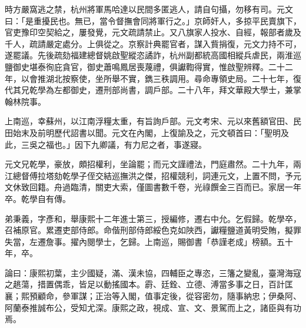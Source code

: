 \begin{pinyinscope}
時方嚴窩逃之禁，杭州將軍馬哈達以民間多匿逃人，請自句攝，勿移有司。元文曰：「是重擾民也。無已，當令督撫會同將軍行之。」京師奸人，多掠平民賣旗下，官吏豫印空契給之，屢發覺，元文疏請禁止。又八旗家人投水、自經，報部者歲及千人，疏請嚴定處分。上俱從之。京察計典罷官者，謀入貲捐復，元文力持不可，遂罷議。先後疏劾福建總督姚啟聖縱恣譎詐，杭州副都統高國相縱兵虐民，兩淮巡鹽御史堪泰徇庇貪官，御史蕭鳴鳳居喪蔑禮，俱讞鞫得實，惟啟聖辨釋。二十二年，以會推湖北按察使，坐所舉不實，鐫三秩調用。尋命專領史局。二十七年，復代其兄乾學為左都御史，遷刑部尚書，調戶部。二十八年，拜文華殿大學士，兼掌翰林院事。

上南巡，幸蘇州，以江南浮糧太重，有旨詢戶部。元文考宋、元以來舊額官田、民田始末及前明歷代詔書以聞。元文在內閣，上復諭及之，元文頓首曰：「聖明及此，三吳之福也。」因下九卿議，有力尼之者，事遂寢。

元文兄乾學，豪放，頗招權利，坐論罷；而元文謹禮法，門庭肅然。二十九年，兩江總督傅拉塔劾乾學子侄交結巡撫洪之傑，招權競利，詞連元文，上置不問，予元文休致回籍。舟過臨清，關吏大索，僅圖書數千卷，光祿饌金三百而已。家居一年卒。乾學自有傳。

弟秉義，字彥和，舉康熙十二年進士第三，授編修，遷右中允。乞假歸。乾學卒，召補原官。累遷吏部侍郎。命偕刑部侍郎綏色克如陜西，讞糧鹽道黃明受賄，擬罪失當，左遷詹事。擢內閱學士，乞歸。上南巡，賜御書「恭謹老成」榜額。五十年，卒。

論曰：康熙初葉，主少國疑，滿、漢未協，四輔臣之專恣，三籓之變亂，臺灣海寇之趒蕩，措置偶乖，皆足以動搖國本。霨、廷銓、立德、溥當多事之日，百計匡襄；熙預顧命，參軍謀；正治等入閣，值事定後，從容密勿，隨事納忠；伊桑阿、阿蘭泰推誠布公，受知尤深。康熙之政，視成、宣、文、景駕而上之，諸臣與有功焉。


\end{pinyinscope}